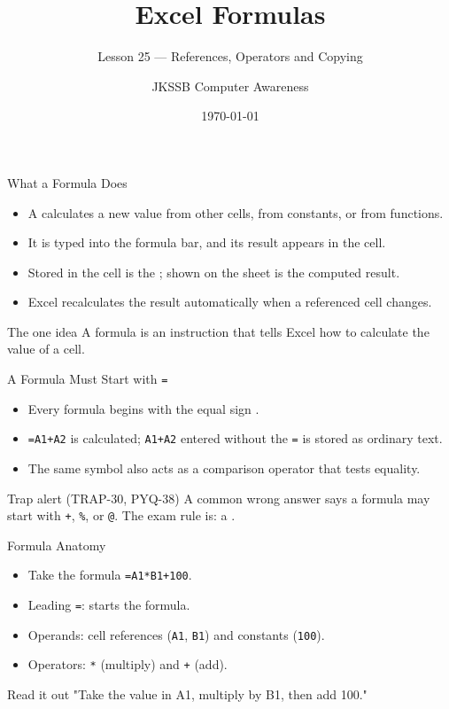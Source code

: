 \documentclass[aspectratio=169]{beamer}
\title{Excel Formulas}
\subtitle{Lesson 25 --- References, Operators and Copying}
\author{JKSSB Computer Awareness}
\date{\today}
\begin{document}
\frame{\titlepage}

\begin{frame}{What a Formula Does}
  \begin{itemize}
    \item A  calculates a new value from other cells, from
      constants, or from functions.
    \item It is typed into the formula bar, and its result appears in the
      cell.
    \item Stored in the cell is the ; shown on the sheet is the
      computed result.
    \item Excel recalculates the result automatically when a referenced cell
      changes.
  \end{itemize}
  \begin{block}{The one idea}
    A formula is an instruction that tells Excel how to calculate the value of
    a cell.
  \end{block}
\end{frame}

\begin{frame}{A Formula Must Start with \texttt{=}}
  \begin{itemize}
    \item Every formula begins with the equal sign \key{\texttt{=}}.
    \item \texttt{=A1+A2} is calculated; \texttt{A1+A2} entered without the
      \texttt{=} is stored as ordinary text.
    \item The same symbol also acts as a comparison operator that tests
      equality.
  \end{itemize}
  \begin{alertblock}{Trap alert (TRAP-30, PYQ-38)}
    A common wrong answer says a formula may start with \texttt{+}, \texttt{\%},
    or \texttt{@}. The exam rule is: a .
  \end{alertblock}
\end{frame}

\begin{frame}{Formula Anatomy}
  \begin{itemize}
    \item Take the formula \texttt{=A1*B1+100}.
    \item Leading \texttt{=}: starts the formula.
    \item Operands: cell references (\texttt{A1}, \texttt{B1}) and constants
      (\texttt{100}).
    \item Operators: \texttt{*} (multiply) and \texttt{+} (add).
  \end{itemize}
  \begin{block}{Read it out}
    "Take the value in A1, multiply by B1, then add 100."
  \end{block}
\end{frame}
\end{document}
